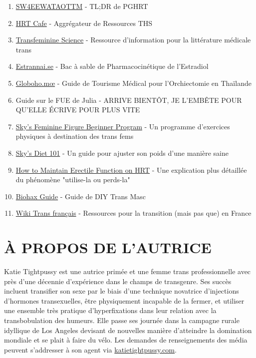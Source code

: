 \documentclass{article}
\begin{document}
\begin{enumerate}
  \item \href{https://startwith4mgestradiolenanthateweeklyandtestatonetothreemonths.com/}{SW4EEWATAOTTM} - TL;DR de PGHRT
  \item \href{https://hrtcafe.net/}{HRT Cafe} - Aggrégateur de Ressources THS
  \item \href{https://transfemscience.org/}{Transfeminine Science} - Ressource d'information pour la littérature médicale trans
  \item \href{https://estrannai.se}{Estrannai.se} - Bac à sable de Pharmacocinétique de l'Estradiol
  \item \href{https://globoho.mœ/}{Globoho.mœ} - Guide de Tourisme Médical pour l'Orchiectomie en Thaïlande
  \item Guide sur le FUE de Julia - ARRIVE BIENTÔT, JE L'EMBÊTE POUR QU'ELLE ÉCRIVE POUR PLUS VITE
  \item \href{https://docs.google.com/document/d/1-NyE5EY5TTaRRMhk7HlTbKJ7HifjEsA4jlDO1qKQVl0/edit?tab=t.0}{Sky's Feminine Figure Beginner Program} - Un programme d'exercices physiques à destination des trans fems
  \item \href{https://docs.google.com/document/d/114sztSw1aVWM2pXLDl9NrHklyvewz3EmFiHiisjM71k/edit?tab=t.0}{Sky's Diet 101} - Un guide pour ajuster son poids d'une manière saine
  \item \href{https://stainedglasswoman.substack.com/p/how-to-maintain-your-penis-function}{How to Maintain Erectile Function on HRT} - Une explication plus détaillée du phénomène "utilise-la ou perds-la"
  \item \href{https://mega.nz/folder/cfwSmBbY#ify6kaueB8SdDD1v12t2Dw}{Biohax Guide} - Guide de DIY Trans Masc
  \item \href{https://wikitrans.co/}{Wiki Trans français} - Ressources pour la transition (mais pas que) en France
\end{enumerate}

\section*{À PROPOS DE L'AUTRICE}

Katie Tightpussy est une autrice primée et une femme trans professionnelle avec près d'une décennie d'expérience dans le champs de transgenre. Ses succès incluent transifier son sexe par le biais d'une technique novatrice d'injections d'hormones transexuelles, être physiquement incapable de la fermer, et utiliser une ensemble très pratique d'hyperfixations dans leur relation avec la transbobulation des humeurs. Elle passe ses journée dans la campagne rurale idyllique de Los Angeles devisant de nouvelles manière d'atteindre la domination mondiale et se plait à faire du vélo. Les demandes de renseignements des média peuvent s'addresser à son agent via \href{http://katietightpussy.com}{katietightpussy.com}. 
\end{document}
